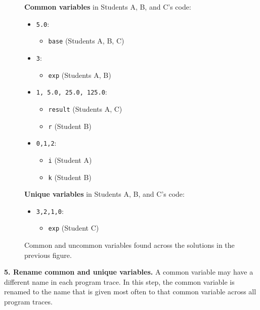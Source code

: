 \begin{figure}
{\bf Common variables} in Students A, B, and C's code:
\begin{itemize}
\item \texttt{5.0}:
\begin{itemize}
\item \texttt{base} (Students A, B, C)
\end{itemize}
\item \texttt{3}:
\begin{itemize}
\item \texttt{exp} (Students A, B) 
\end{itemize}
\item \texttt{1, 5.0, 25.0, 125.0}: 
\begin{itemize}
\item \texttt{result} (Students A, C)
\item \texttt{r} (Student B)
\end{itemize}
\item \texttt{0,1,2}:
\begin{itemize}
\item \texttt{i} (Student A) 
\item \texttt{k} (Student B)
\end{itemize}
\end{itemize}
{\bf Unique variables} in Students A, B, and C's code:
\begin{itemize}
\item \texttt{3,2,1,0}:
\begin{itemize}
\item \texttt{exp} (Student C)
\end{itemize}
\end{itemize}
\caption{Common and uncommon variables found across the solutions in the previous figure.}
\label{fig:allvars}
\end{figure}

{\bf 5. Rename common and unique variables.} A common variable may have a different name in each program trace. In this step, the common variable is renamed to the name that is given most often to that common variable across all program traces. 


